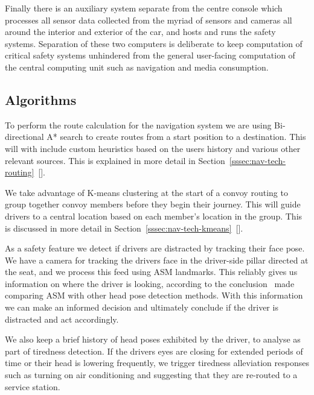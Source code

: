 \documentclass{article}
\begin{document}
Finally there is an auxiliary system separate from the centre console which processes all sensor data collected from the myriad of sensors and cameras all around the interior and exterior of the car, and hosts and runs the safety systems. Separation of these two computers is deliberate to keep computation of critical safety systems unhindered from the general user-facing computation of the central computing unit such as navigation and media consumption.

\subsection{Algorithms}\label{ssec:algorithms}
To perform the route calculation for the navigation system we are using Bi-directional A* search to create routes from a start position to a destination. This will with include custom heuristics based on the users history and various other relevant sources. This is explained in more detail in Section~\ref{sssec:nav-tech-routing}~[].

We take advantage of K-means clustering at the start of a convoy routing to group together convoy members before they begin their journey. This will guide drivers to a central location based on each member's location in the group. This is discussed in more detail in Section~\ref{sssec:nav-tech-kmeans}~[].

As a safety feature we detect if drivers are distracted by tracking their face pose. We have a camera for tracking the drivers face in the driver-side pillar directed at the seat, and we process this feed using ASM landmarks. This reliably gives us information on where the driver is looking, according to the conclusion~\textcite{head-pose} made comparing ASM with other head pose detection methods. With this information we can make an informed decision and ultimately conclude if the driver is distracted and act accordingly.

We also keep a brief history of head poses exhibited by the driver, to analyse as part of tiredness detection. If the drivers eyes are closing for extended periods of time or their head is lowering frequently, we trigger tiredness alleviation responses such as turning on air conditioning and suggesting that they are re-routed to a service station.
\end{document}
